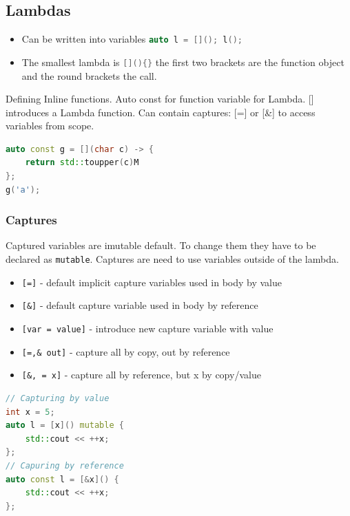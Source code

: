 \subsection{Lambdas}
\begin{itemize}
  \itemsep -0.5em 
  \item Can be written into variables \lstinline[language=C++]|auto l = [](); l();|
  \item The smallest lambda is \lstinline[language=C++]|[](){}| the first two brackets are the function object and the round brackets the call.
\end{itemize}

Defining Inline functions. Auto const for function variable for Lambda. [] introduces a Lambda function. Can contain captures: [=] or [\&] to access variables from scope.
\begin{lstlisting}[language=C++]
auto const g = [](char c) -> {
	return std::toupper(c)M
};
g('a');
\end{lstlisting}

\subsubsection{Captures}
Captured variables are imutable default. To change them they have to be declared as \lstinline|mutable|. Captures are need to use variables outside of the lambda.
\begin{itemize}
	\itemsep -0.5em
	\item \lstinline|[=]| - default implicit capture variables used in body by value
	\item \lstinline|[&]| - default capture variable used in body by reference
	\item \lstinline|[var = value]| - introduce new capture variable with value
	\item \lstinline|[=,& out]| - capture all by copy, out by reference 
	\item \lstinline|[&, = x]| - capture all by reference, but x by copy/value
\end{itemize}
\begin{lstlisting}[language=C++]
// Capturing by value
int x = 5;
auto l = [x]() mutable {
	std::cout << ++x;
};
// Capuring by reference
auto const l = [&x]() {
	std::cout << ++x;
};
\end{lstlisting}

